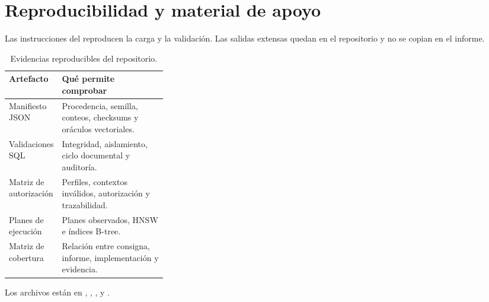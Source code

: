 \section{Reproducibilidad y material de apoyo}

Las instrucciones del  reproducen la carga y la validación. Las
salidas extensas quedan en el repositorio y no se copian en el informe.

\begin{table}[ht]
\centering
\small
\begin{tabularx}{\textwidth}{>{\raggedright\arraybackslash}p{0.31\linewidth}Y}
\toprule
Artefacto & Qué permite comprobar \\
\midrule
Manifiesto JSON & Procedencia, semilla, conteos, checksums y oráculos vectoriales. \\
Validaciones SQL & Integridad, aislamiento, ciclo documental y auditoría. \\
Matriz de autorización & Perfiles, contextos inválidos, autorización y trazabilidad. \\
Planes de ejecución & Planes observados, HNSW e índices B-tree. \\
Matriz de cobertura & Relación entre consigna, informe, implementación y evidencia. \\
\bottomrule
\end{tabularx}
\caption{Evidencias reproducibles del repositorio.}
\end{table}

Los archivos están en ,
,
,
 y .
